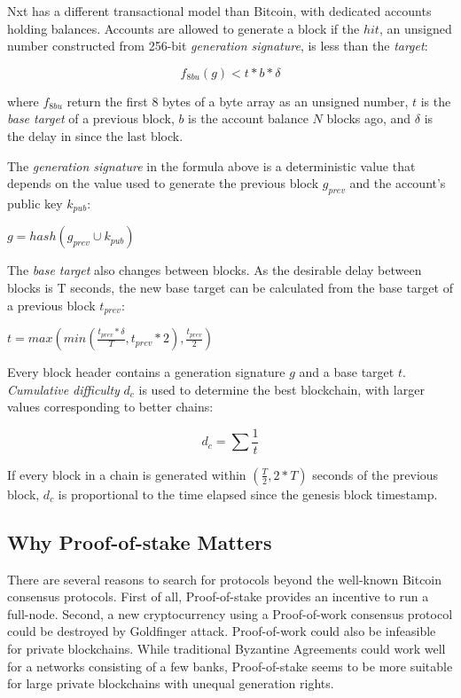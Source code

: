 \documentclass[preprint,review,3p,times,twocolumn]{elsarticle}
\begin{document}
Nxt has a different transactional model than Bitcoin, with dedicated accounts holding balances. Accounts are allowed to generate a block if the \(hit\), an unsigned number constructed from 256-bit \textit{generation signature}, is less than the \textit{target}:

\begin{equation}f_{8bu}(g) < t*b*\delta \end{equation}

where \(f_{8bu}\) return the first 8 bytes of a byte array as an unsigned number, \(t\) is the \textit{base target} of a previous block, \(b\) is the account balance \(N\) blocks ago, and \(\delta\) is the delay in since the last block.

The \textit{generation signature} in the formula above is a deterministic value that depends on the value used to generate the previous block \(g_{prev}\) and the account's public key \(k_{pub}\):

\(g = hash(g_{prev} \cup k_{pub})\)

The \textit{base target} also changes between blocks. As the desirable delay between blocks is T seconds, the new base target can be calculated from the base target of a previous block \(t_{prev}\):

\(t = max(min(\frac{t_{prev}*\delta}{T}, t_{prev}*2), \frac{t_{prev}}{2})\)	

Every block header contains a generation signature \(g\) and a base target \(t\). \textit{Cumulative difficulty} \(d_c\) is used to determine the best blockchain, with larger values corresponding to better chains:

\begin{equation} d_c = \sum \frac {1}{t} \end{equation}

If every block in a chain is generated within \((\frac{T}{2},2*T)\) seconds of the previous block, \(d_c\) is proportional to the time elapsed since the genesis block timestamp.

\subsection{Why Proof-of-stake Matters}

There are several reasons to search for protocols beyond the well-known Bitcoin consensus protocols. First of all, Proof-of-stake provides an incentive to run a full-node\cite{Bentov2013}. Second, a new cryptocurrency using a Proof-of-work consensus protocol could be destroyed by Goldfinger attack\cite{Bonneau2015}. Proof-of-work could also be infeasible for private blockchains. While traditional Byzantine Agreements\cite{Cachin2005} could work well for a networks consisting of a few banks, Proof-of-stake seems to be more suitable for large private blockchains with unequal generation rights. 
\end{document}
